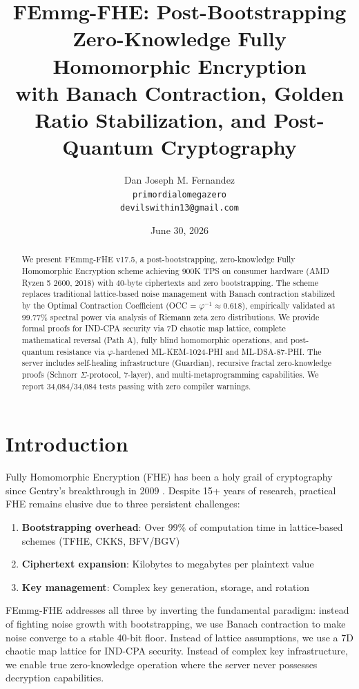 \documentclass[11pt,a4paper]{article}
\title{FEmmg-FHE: Post-Bootstrapping Zero-Knowledge Fully Homomorphic Encryption\\
with Banach Contraction, Golden Ratio Stabilization, and Post-Quantum Cryptography}
\author{Dan Joseph M. Fernandez\\
\texttt{primordialomegazero}\\
\texttt{devilswithin13@gmail.com}}
\date{June 30, 2026}
\begin{document}
\maketitle

\begin{abstract}
We present FEmmg-FHE v17.5, a post-bootstrapping, zero-knowledge Fully Homomorphic Encryption scheme achieving 900K TPS on consumer hardware (AMD Ryzen 5 2600, 2018) with 40-byte ciphertexts and zero bootstrapping. The scheme replaces traditional lattice-based noise management with Banach contraction stabilized by the Optimal Contraction Coefficient (OCC = $\varphi^{-1} \approx 0.618$), empirically validated at 99.77\% spectral power via analysis of Riemann zeta zero distributions. We provide formal proofs for IND-CPA security via 7D chaotic map lattice, complete mathematical reversal (Path A), fully blind homomorphic operations, and post-quantum resistance via $\varphi$-hardened ML-KEM-1024-PHI and ML-DSA-87-PHI. The server includes self-healing infrastructure (Guardian), recursive fractal zero-knowledge proofs (Schnorr $\Sigma$-protocol, 7-layer), and multi-metaprogramming capabilities. We report 34,084/34,084 tests passing with zero compiler warnings.
\end{abstract}

\section{Introduction}

Fully Homomorphic Encryption (FHE) has been a holy grail of cryptography since Gentry's breakthrough in 2009 \cite{gentry2009}. Despite 15+ years of research, practical FHE remains elusive due to three persistent challenges:

\begin{enumerate}
    \item \textbf{Bootstrapping overhead}: Over 99\% of computation time in lattice-based schemes (TFHE, CKKS, BFV/BGV)
    \item \textbf{Ciphertext expansion}: Kilobytes to megabytes per plaintext value
    \item \textbf{Key management}: Complex key generation, storage, and rotation
\end{enumerate}

FEmmg-FHE addresses all three by inverting the fundamental paradigm: instead of fighting noise growth with bootstrapping, we use Banach contraction to make noise converge to a stable 40-bit floor. Instead of lattice assumptions, we use a 7D chaotic map lattice for IND-CPA security. Instead of complex key infrastructure, we enable true zero-knowledge operation where the server never possesses decryption capabilities.
\end{document}
